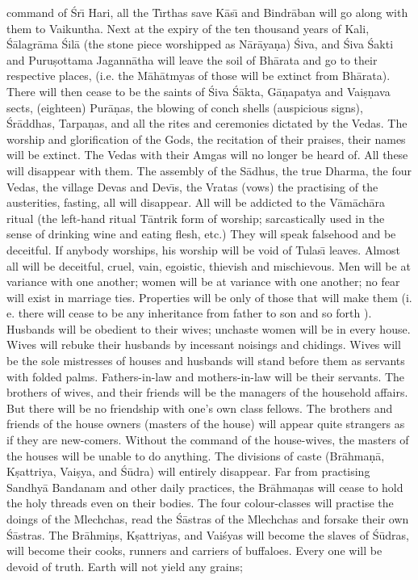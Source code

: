 command of \'Sr\={\i} Hari, all the T\={\i}rthas save K\=as\={\i} and Bindr\=aban will go along with them to Vaikuntha. Next at the expiry of the ten thousand years of Kali, \'S\=alagr\=ama \'Sil\=a (the stone piece worshipped as N\=ar\=aya\d{n}a) \'Siva, and \'Siva \'Sakti and Puru\d{s}ottama Jagann\=atha will leave the soil of Bh\=arata and go to their respective places, (i.e. the M\=ah\=atmyas of those will be extinct from Bh\=arata). There will then cease to be the saints of \'Siva \'S\=akta, G\=a\d{n}apatya and Vai\d{s}\d{n}ava sects, (eighteen) Pur\=a\d{n}as, the blowing of conch shells (auspicious signs), \'Sr\=addhas, Tarpa\d{n}as, and all the rites and ceremonies dictated by the Vedas. The worship and glorification of the Gods, the recitation of their praises, their names will be extinct. The Vedas with their Amgas will no longer be heard of. All these will disappear with them. The assembly of the S\=adhus, the true Dharma, the four Vedas, the village Devas and Dev\={\i}s, the Vratas (vows) the practising of the austerities, fasting, all will disappear. All will be addicted to the V\=am\=ach\=ara ritual (the left-hand ritual T\=antrik form of worship; sarcastically used in the sense of drinking wine and eating flesh, etc.) They will speak falsehood and be deceitful. If anybody worships, his worship will be void of Tulas\={\i} leaves. Almost all will be deceitful, cruel, vain, egoistic, thievish and mischievous. Men will be at variance with one another; women will be at variance with one another; no fear will exist in marriage ties. Properties will be only of those that will make them (i. e. there will cease to be any inheritance from father to son and so forth ). Husbands will be obedient to their wives; unchaste women will be in every house. Wives will rebuke their husbands by incessant noisings and chidings. Wives will be the sole mistresses of houses and husbands will stand before them as servants with folded palms. Fathers-in-law and mothers-in-law will be their servants. The brothers of wives, and their friends will be the managers of the household affairs. But there will be no friendship with one's own class fellows. The brothers and friends of the house owners (masters of the house) will appear quite strangers as if they are new-comers. Without the command of the house-wives, the masters of the houses will be unable to do anything. The divisions of caste (Br\=ahma\d{n}\=a, K\d{s}attriya, Vai\d{s}ya, and \'S\=udra) will entirely disappear. Far from practising Sandhy\=a Bandanam and other daily practices, the Br\=ahma\d{n}as will cease to hold the holy threads even on their bodies. The four colour-classes will practise the doings of the Mlechchas, read the \'S\=astras of the Mlechchas and forsake their own \'S\=astras. The Br\=ahmi\d{n}s, K\d{s}attriyas, and Vai\'syas will become the slaves of \'S\=udras, will become their cooks, runners and carriers of buffaloes. Every one will be devoid of truth. Earth will not yield any grains;

